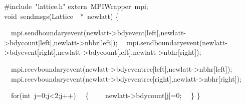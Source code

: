 {\ttfamily \raggedright \footnotesize
\#include\ "{}lattice.h"{}
extern\ MPIWrapper\ mpi;
void\ sendmsgs(Lattice\ \ *\ newlatt)
\{

\ \ mpi.sendboundaryevent(newlatt-{}>{}bdyevent[left],newlatt-{}>{}bdycount[left],newlatt-{}>{}nbhr[left]);
\ \ mpi.sendboundaryevent(newlatt-{}>{}bdyevent[right],newlatt-{}>{}bdycount[left],newlatt-{}>{}nbhr[right]);

\ \ mpi.recvboundaryevent(newlatt-{}>{}bdyeventrec[left],newlatt-{}>{}nbhr[left]);
\ \ mpi.recvboundaryevent(newlatt-{}>{}bdyeventrec[right],newlatt-{}>{}nbhr[right]);

\ \ for(int\ j=0;j<{}2;j++)
\ \ \{
\ \ \ \ newlatt-{}>{}bdycount[j]=0;
\ \ \}
\}

 }
\normalfont\normalsize


